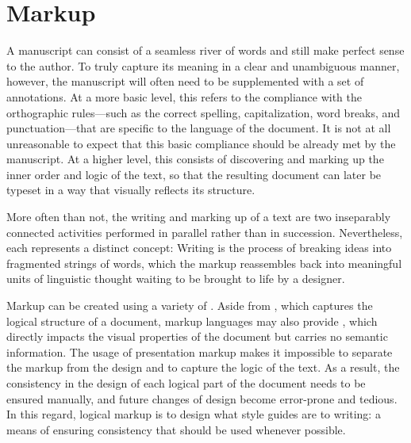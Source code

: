 \documentclass[a5paper,10pt]{book}
\begin{document}


\chapter{Markup}
A manuscript can consist of a seamless river of words and still make perfect
sense to the author. To truly capture its meaning in a clear and unambiguous
manner, however, the manuscript will often need to be supplemented with a set of
annotations. At a more basic level, this refers to the compliance with the
orthographic rules---such as the correct spelling, capitalization, word breaks,
and punctuation---that are specific to the language of the document.  It is not
at all unreasonable to expect that this basic compliance should be already met
by the manuscript. At a higher level, this consists of discovering and marking
up the inner order and logic of the text, so that the resulting document can
later be typeset in a way that visually reflects its structure.

More often than not, the writing and marking up of a text are two inseparably
connected activities performed in parallel rather than in succession.
Nevertheless, each represents a distinct concept: Writing is the process of
breaking ideas into fragmented strings of words, which the markup reassembles
back into meaningful units of linguistic thought waiting to be brought to life
by a designer.

Markup can be created using a variety of . Aside from
, which captures the logical structure of a document,
markup languages may also provide , which directly
impacts the visual properties of the document but carries no semantic
information. The usage of presentation markup makes it impossible to separate
the markup from the design and to capture the logic of the text. As a result,
the consistency in the design of each logical part of the document needs to be
ensured manually, and future changes of design become error-prone and tedious.
In this regard, logical markup is to design what style guides are to writing: a
means of ensuring consistency that should be used whenever possible.
\end{document}
